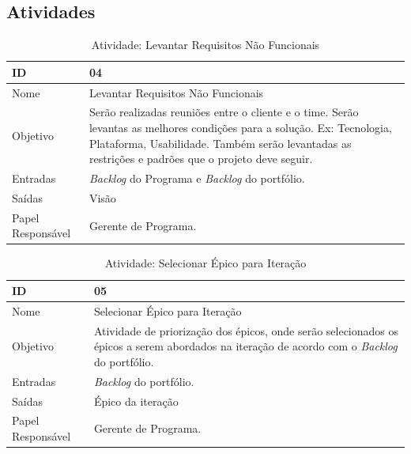  \subsection{Atividades}

  \begin{table}[H]
    \centering
      \begin{tabular}{| m{5em} | m{10cm} |}
        \hline
        ID       & 04   \\ \hline
        Nome     & Levantar Requisitos Não Funcionais   \\ \hline
        Objetivo & Serão realizadas reuniões entre o cliente e o time. Serão levantas as melhores condições para a solução. Ex: Tecnologia, Plataforma, Usabilidade. Também serão levantadas as restrições e padrões que o projeto deve seguir. \\ \hline
        Entradas & \textit{Backlog} do Programa e \textit{Backlog} do portfólio.   \\ \hline
        Saídas   & Visão \\ \hline
        Papel Responsável   & Gerente de Programa. \\ \hline
      \end{tabular}
      \caption{Atividade: Levantar Requisitos Não Funcionais}
      \label{tabela:atividade4}
  \end{table}

  \begin{table}[H]
    \centering
      \begin{tabular}{| m{5em} | m{10cm} |}
        \hline
        ID       & 05   \\ \hline
        Nome     & Selecionar Épico para Iteração   \\ \hline
        Objetivo & Atividade de priorização dos épicos, onde serão selecionados os épicos a serem abordados na iteração de acordo com o \textit{Backlog} do portfólio. \\ \hline
        Entradas & \textit{Backlog} do portfólio.\\ \hline
        Saídas   & Épico da iteração \\ \hline
        Papel Responsável   & Gerente de Programa. \\ \hline
      \end{tabular}
      \caption{Atividade: Selecionar Épico para Iteração}
      \label{tabela:atividade5}
  \end{table}


